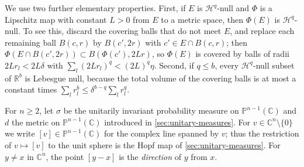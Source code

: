 We use two further elementary properties. First, if $E$ is $\mathcal H^q$-null and $\Phi$ is a Lipschitz map with constant $L>0$ from $E$ to a metric space, then $\Phi(E)$ is $\mathcal H^q$-null. To see this, discard the covering balls that do not meet $E$, and replace each remaining ball $B(c,r)$ by $B(c',2r)$ with $c'\in E\cap B(c,r)$; then $\Phi(E\cap B(c',2r))\subset B(\Phi(c'),2Lr)$, so $\Phi(E)$ is covered by balls of radii $2Lr_l<2L\delta$ with $\sum_l(2Lr_l)^q<(2L)^q\eta$. Second, if $q\leq b$, every $\mathcal H^q$-null subset of $\mathbb R^b$ is Lebesgue null, because the total volume of the covering balls is at most a constant times $\sum_lr_l^b\leq\delta^{b-q}\sum_l r_l^q$.

For $n\geq2$, let $\sigma$ be the unitarily invariant probability measure on $\mathbb P^{n-1}(\mathbb C)$ and $d$ the metric on $\mathbb P^{n-1}(\mathbb C)$ introduced in \cref{sec:unitary-measures}. For $v\in\mathbb{C}^n\setminus\{0\}$ we write $[v]\in\mathbb P^{n-1}(\mathbb C)$ for the complex line spanned by $v$; thus the restriction of $v\mapsto[v]$ to the unit sphere is the Hopf map of \cref{sec:unitary-measures}. For $y\neq x$ in $\mathbb{C}^n$, the point $[y-x]$ is the \emph{direction} of $y$ from $x$.


